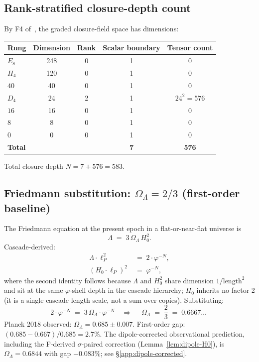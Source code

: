 \documentclass[11pt]{article}
\theoremstyle{plain}
\theoremstyle{definition}
\theoremstyle{remark}
\begin{document}
\subsection{Rank-stratified closure-depth count}\label{app:depth-count}

By F4 of~\citet{SmartXXXVI}, the graded closure-field space has dimensions:
\begin{center}
\begin{tabular}{lcccc}
\toprule
Rung & Dimension & Rank & Scalar boundary & Tensor count \\
\midrule
$E_8$ & 248 & 0 & 1 & 0 \\
$H_4$ & 120 & 0 & 1 & 0 \\
$40$  & 40  & 0 & 1 & 0 \\
$D_4$ & 24  & 2 & 1 & $24^2 = 576$ \\
$16$  & 16  & 0 & 1 & 0 \\
$8$   & 8   & 0 & 1 & 0 \\
$0$   & 0   & 0 & 1 & 0 \\
\midrule
\textbf{Total} & & & \textbf{7} & \textbf{576} \\
\bottomrule
\end{tabular}
\end{center}
Total closure depth $N = 7 + 576 = 583$. \checkmark

\subsection{Friedmann substitution: $\Omega_\Lambda = 2/3$ (first-order baseline)}\label{app:omega-derivation}

The Friedmann equation at the present epoch in a flat-or-near-flat universe is
\[
  \Lambda \;=\; 3 \, \Omega_\Lambda \, H_0^2.
\]
Cascade-derived:
\begin{align*}
  \Lambda \cdot \ell_P^2 \;&=\; 2 \cdot \varphi^{-N}, \\
  (H_0 \cdot \ell_P)^2 \;&=\; \varphi^{-N},
\end{align*}
where the second identity follows because $\Lambda$ and $H_0^2$ share dimension $1/\text{length}^2$ and sit at the same $\varphi$-shell depth in the cascade hierarchy; $H_0$ inherits no factor 2 (it is a single cascade length scale, not a sum over copies). Substituting:
\[
  2 \cdot \varphi^{-N} \;=\; 3 \, \Omega_\Lambda \cdot \varphi^{-N}
  \quad\Longrightarrow\quad
  \boxed{\;\Omega_\Lambda \;=\; \frac{2}{3} \;=\; 0.6667\ldots\;}
\]
Planck 2018 observed: $\Omega_\Lambda = 0.685 \pm 0.007$. First-order gap: $(0.685 - 0.667)/0.685 = 2.7\%$. The dipole-corrected observational prediction, including the F-derived $\sigma$-paired correction (Lemma~\ref{lem:dipole-H0}), is $\Omega_\Lambda = 0.6844$ with gap $-0.083\%$; see \S\ref{app:dipole-corrected}.
\end{document}
